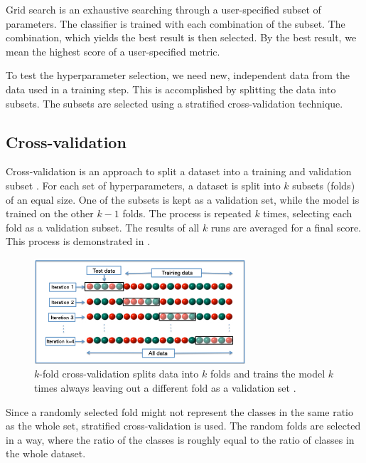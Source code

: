 Grid search is an exhaustive searching through a user-specified subset of parameters. The classifier is trained with each combination of the subset. The combination, which yields the best result is then selected. By the best result, we mean the highest score of a user-specified metric.

To test the hyperparameter selection, we need new, independent data from the data used in a training step. This is accomplished by splitting the data into subsets. The subsets are selected using a stratified cross-validation technique.

\subsection{Cross-validation}
Cross-validation is an approach to split a dataset into a training and validation subset \cite{RodPerLoz10}. For each set of hyperparameters, a dataset is split into $k$ subsets (folds) of an equal size. One of the subsets is kept as a validation set, while the model is trained on the other $k-1$ folds. The process is repeated $k$ times, selecting each fold as a validation subset. The results of all $k$ runs are averaged for a final score. This process is demonstrated in .
\begin{figure}
    \centering
    \includegraphics[width=0.7\textwidth]{Figures/svm/k-fold.jpg}
    \caption[$k$-fold cross-validation splits data into $k$ folds and trains the model $k$ times always leaving out a different fold as a validation set]{$k$-fold cross-validation splits data into $k$ folds and trains the model $k$ times always leaving out a different fold as a validation set \cite{crossval}.}
    \label{fig:k-fold}
\end{figure}

Since a randomly selected fold might not represent the classes in the same ratio as the whole set, stratified cross-validation is used. The random folds are selected in a way, where the ratio of the classes is roughly equal to the ratio of classes in the whole dataset.
